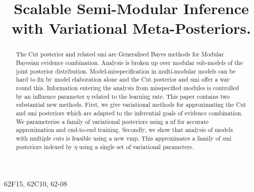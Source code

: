 \documentclass[ba,preprint]{imsart}%
\numberwithin{equation}{section}
\theoremstyle{plain}
\begin{document}
\begin{frontmatter}
  \title{Scalable Semi-Modular Inference with Variational Meta-Posteriors.}


  \begin{abstract}
    The Cut posterior and related \acrfull*{smi} are Generalised Bayes methods for Modular Bayesian evidence combination. Analysis is broken up over modular sub-models of the joint posterior distribution. Model-misspecification in multi-modular models can be hard to fix by model elaboration alone and the Cut posterior and \acrshort*{smi} offer a way round this. Information entering the analysis from misspecified modules is controlled by an influence parameter $\eta$ related to the learning rate. This paper contains two substantial new methods. First, we give variational methods for approximating the Cut and \acrshort*{smi} posteriors which are adapted to the inferential goals of evidence combination. We parameterise a family of variational posteriors using a \acrlong*{nf} for accurate approximation and end-to-end training. Secondly, we show that analysis of models with multiple cuts is feasible using a new \acrlong*{vmp}. This approximates a family of \acrshort*{smi} posteriors indexed by $\eta$ using a single set of variational parameters.
  \end{abstract}

  \begin{keyword}[class=MSC]
    62F15, 62C10, 62-08
  \end{keyword}

  \begin{keyword}
  \end{keyword}

\end{frontmatter}






\clearpage
\newpage

\appendix

\end{document}
